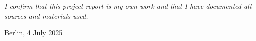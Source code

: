 \chapter*{}
\vspace{15cm}
\hfill\parbox{8cm}{
\raggedleft
\textit{I confirm that this project report is my own work and that I have documented all sources and materials used.}\par 
\vspace{1em}
Berlin, 4 July 2025
}